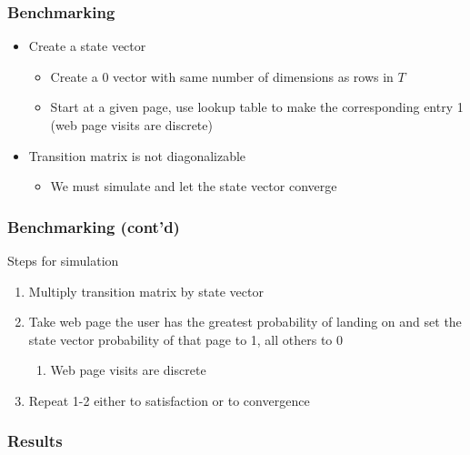 \documentclass{beamer}
\begin{document}
\begin{frame}
  \frametitle{Benchmarking}
  \begin{itemize}
    \item Create a state vector
      \begin{itemize}
        \item Create a 0 vector with same number of dimensions as rows in $T$ \\
        \item Start at a given page, use lookup table to make the corresponding entry 1
          (web page visits are discrete)
      \end{itemize}
    \item Transition matrix is not diagonalizable
      \begin{itemize}
        \item We must simulate and let the state vector converge
      \end{itemize}
  \end{itemize}
\end{frame}

\begin{frame}
  \frametitle{Benchmarking (cont'd)}
  Steps for simulation
  \begin{enumerate}
    \item Multiply transition matrix by state vector
    \item Take web page the user has the greatest probability of landing on and
      set the state vector probability of that page to 1, all others to 0
      \begin{enumerate}
        \item Web page visits are discrete
      \end{enumerate}
    \item Repeat 1-2 either to satisfaction or to convergence
  \end{enumerate}
\end{frame}

\begin{frame}
  \frametitle{Results}
\end{frame}
\end{document}
